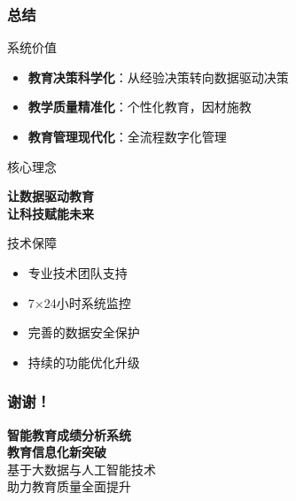 \documentclass[aspectratio=169]{beamer}
\begin{document}
\begin{frame}
    \frametitle{总结}
    \begin{block}{系统价值}
        \begin{itemize}
            \item \textbf{教育决策科学化}：从经验决策转向数据驱动决策
            \item \textbf{教学质量精准化}：个性化教育，因材施教
            \item \textbf{教育管理现代化}：全流程数字化管理
        \end{itemize}
    \end{block}
    
    \begin{block}{核心理念}
        \begin{center}
            \Large
            \textcolor{mainblue}{\textbf{让数据驱动教育}}\\
            \textcolor{accentgreen}{\textbf{让科技赋能未来}}
        \end{center}
    \end{block}
    
    \begin{block}{技术保障}
        \begin{itemize}
            \item 专业技术团队支持
            \item 7×24小时系统监控
            \item 完善的数据安全保护
            \item 持续的功能优化升级
        \end{itemize}
    \end{block}
\end{frame}

\begin{frame}
    \frametitle{谢谢！}
    \begin{center}
        \Huge
        \textcolor{mainblue}{\textbf{智能教育成绩分析系统}}\\
        \vspace{1cm}
        \Large
        \textcolor{accentgreen}{\textbf{教育信息化新突破}}\\
        \vspace{1cm}
        \normalsize
        基于大数据与人工智能技术\\
        助力教育质量全面提升
    \end{center}
\end{frame}
\end{document}
